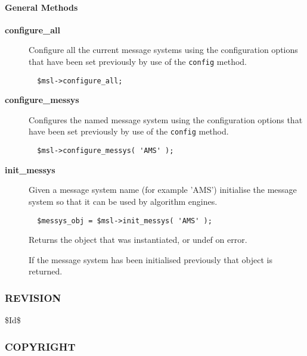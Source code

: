 \paragraph*{General Methods\label{ORAC::Msg::MessysLaunch_General_Methods}}
\begin{description}

\item[{\textbf{configure\_all}}] \mbox{}

Configure all the current message systems using the configuration
options that have been set previously by use of the \texttt{config}
method.

\begin{verbatim}
  $msl->configure_all;
\end{verbatim}

\item[{\textbf{configure\_messys}}] \mbox{}

Configures the named message system using the configuration
options that have been set previously by use of the \texttt{config}
method.

\begin{verbatim}
  $msl->configure_messys( 'AMS' );
\end{verbatim}

\item[{\textbf{init\_messys}}] \mbox{}

Given a message system name (for example 'AMS') initialise the
message system so that it can be used by algorithm engines.

\begin{verbatim}
  $messys_obj = $msl->init_messys( 'AMS' );
\end{verbatim}


Returns the object that was instantiated, or undef on error.



If the message system has been initialised previously that
object is returned.

\end{description}
\subsubsection*{REVISION\label{ORAC::Msg::MessysLaunch_REVISION}}


\$Id\$

\subsubsection*{COPYRIGHT\label{ORAC::Msg::MessysLaunch_COPYRIGHT}}


